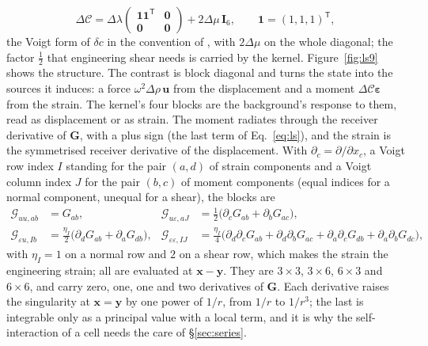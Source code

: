 \documentclass[11pt,a4paper]{article}
\newcommand{\bG}{\mathbf{G}}
\newcommand{\bI}{\mathbf{I}}
\newcommand{\bx}{\mathbf{x}}
\newcommand{\by}{\mathbf{y}}
\begin{document}
\begin{equation}\label{eq:voigtcontrast}
  \Delta\mathcal C=\Delta\lambda\begin{pmatrix}\mathbf 1\mathbf 1^{\mathsf T}&\mathbf 0\\
    \mathbf 0&\mathbf 0\end{pmatrix}+2\Delta\mu\,\bI_6,\qquad
  \mathbf 1=(1,1,1)^{\mathsf T},
\end{equation}
the Voigt form of $\delta c$ in the convention of \citet{NestorError2026}, with $2\Delta\mu$ on the
whole diagonal; the factor $\tfrac12$ that engineering shear needs is carried by the kernel.
Figure~\ref{fig:ls9} shows the structure. The contrast is block diagonal and turns the state into the
sources it induces: a force $\omega^2\Delta\rho\,\mathbf u$ from the displacement and a moment
$\Delta\mathcal C\boldsymbol\varepsilon$ from the strain. The kernel's four blocks are the background's
response to them, read as displacement or as strain. The moment radiates through the receiver derivative
of $\bG$, with a plus sign (the last term of Eq.~\eqref{eq:ls}), and the strain is the symmetrised receiver
derivative of the displacement. With $\partial_c=\partial/\partial x_c$, a Voigt row index $I$ standing for
the pair $(a,d)$ of strain components and a Voigt column index $J$ for the pair $(b,c)$ of moment
components (equal indices for a normal component, unequal for a shear), the blocks are
\begin{equation}\label{eq:kernelblocks}
\begin{aligned}
  \mathcal G_{uu,ab}&=G_{ab}, &
  \mathcal G_{u\varepsilon,aJ}&=\tfrac12\bigl(\partial_cG_{ab}+\partial_bG_{ac}\bigr),\\
  \mathcal G_{\varepsilon u,Ib}&=\tfrac{\eta_I}2\bigl(\partial_dG_{ab}+\partial_aG_{db}\bigr), &
  \mathcal G_{\varepsilon\varepsilon,IJ}&=\tfrac{\eta_I}4\bigl(\partial_d\partial_cG_{ab}+\partial_d\partial_bG_{ac}
    +\partial_a\partial_cG_{db}+\partial_a\partial_bG_{dc}\bigr),
\end{aligned}
\end{equation}
with $\eta_I=1$ on a normal row and $2$ on a shear row, which makes the strain the engineering strain; all
are evaluated at $\bx-\by$. They are $3\times3$, $3\times6$, $6\times3$ and $6\times6$, and carry zero,
one, one and two derivatives of $\bG$. Each derivative raises the singularity at $\bx=\by$ by one power of
$1/r$, from $1/r$ to $1/r^3$; the last is integrable only as a principal value with a local term, and it
is why the self-interaction of a cell needs the care of \S\ref{sec:series}.
\end{document}
